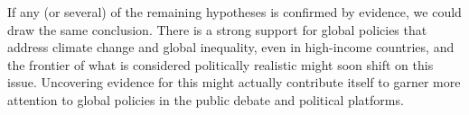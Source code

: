 If any (or several) of the remaining hypotheses is confirmed by evidence, we could draw the same conclusion. %
There is a strong support for global policies that address climate change and global inequality, even in high-income countries, and the frontier of what is considered politically realistic might soon shift on this issue. Uncovering evidence for this might actually contribute itself to garner more attention to global policies in the public debate and political platforms. %

